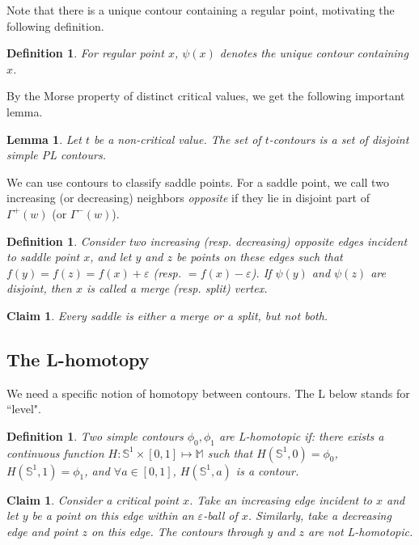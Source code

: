 \documentclass[11pt]{article}
\newtheorem{lemma}[theorem]{Lemma}
\newtheorem{claim}[theorem]{Claim}
\newtheorem{definition}[theorem]{Definition}
\theoremstyle{definition}
\newcommand{\MM}{\mathbb{M}}
\newcommand{\SSS}{\mathbb{S}}
\newcommand{\eps}{\varepsilon}
\newcommand{\cont}{\psi}
\begin{document}
Note that there is a unique contour containing a regular point, motivating the following definition.
\begin{definition} \label{def:p-cont}
For regular point $x$, $\cont(x)$ denotes the unique contour containing $x$.
\end{definition}

By the Morse property of distinct critical values, we get the following important lemma.

\begin{lemma} \label{lem:cont} Let $t$ be a non-critical value. The set of $t$-contours is a set
of disjoint simple PL contours.
\end{lemma}

We can use contours to classify saddle points. For a saddle point, we call two increasing (or decreasing) neighbors \emph{opposite}
if they lie in disjoint part of $\Gamma^+(w)$ (or $\Gamma^-(w)$).

\begin{definition} \label{def:merge} Consider two increasing (resp. decreasing) opposite edges incident to saddle point $x$,
and let $y$ and $z$ be points on these edges such that $f(y) = f(z) = f(x) + \eps$ (resp. $=f(x) - \eps$).
If $\cont(y)$ and $\cont(z)$ are disjoint, then $x$ is called a \emph{merge} (resp. \emph{split}) vertex.
\end{definition}

\begin{claim} \label{clm:saddle} Every saddle is either a merge or a split, but not both.
\end{claim}


\subsection{The L-homotopy} \label{sec:l-hom}
We need a specific notion of homotopy between contours. The L below stands for ``level".

\begin{definition} \label{def:cont-hom} Two simple contours $\phi_0, \phi_1$ are \emph{L-homotopic}
if: there exists a continuous function $H:\SSS^1 \times [0,1] \mapsto \MM$
such that $H(\SSS^1,0) = \phi_0$, $H(\SSS^1,1) = \phi_1$, and $\forall a \in [0,1]$,
$H(\SSS^1,a)$ is a contour.
\end{definition}

\begin{claim} \label{clm:non-hom} Consider a critical point $x$. Take an increasing edge incident to $x$
and let $y$ be a point on this edge within an $\eps$-ball of $x$. Similarly, take a decreasing edge
and point $z$ on this edge. The contours through $y$ and $z$ are not L-homotopic.
\end{claim}
\end{document}
